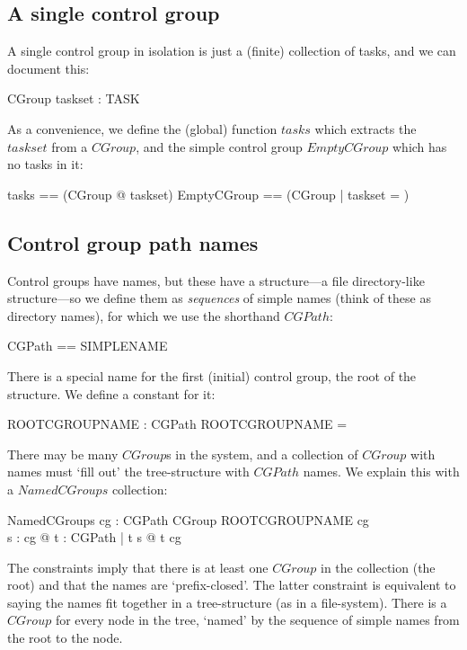 \documentclass[a4paper,twoside,12pt]{article}
\begin{document}
\subsection{A single control group}

A single control group in isolation is just a (finite) collection of tasks, and we can document this:

\begin{schema}{CGroup}
taskset : \finset TASK
\end{schema}

As a convenience, we define the (global) function $tasks$ which extracts the $taskset$ from a $CGroup$, and the
simple control group $EmptyCGroup$ which has no tasks in it:
\begin{zed}
tasks == (\lambda CGroup @ taskset)
\also
EmptyCGroup == (\mu CGroup | taskset = \emptyset )
\end{zed}

\subsection{Control group path names}

Control groups have names, but these have a structure---a file directory-like structure---so we define them as \emph{sequences} of simple names (think of these as directory names), for which we use the shorthand $CGPath$:

\begin{zed}
CGPath == \seq SIMPLENAME
\end{zed}

There is a special name for the first (initial) control group, the root of the structure. We define a constant for it:

\begin{axdef}{}
ROOTCGROUPNAME : CGPath
\where
ROOTCGROUPNAME = \langle \rangle
\end{axdef}

There may be many $CGroup$s in the system, and a collection of $CGroup$ with names must `fill out' the tree-structure with $CGPath$ names. We explain this with a $NamedCGroups$ collection:

\begin{schema}{NamedCGroups}
cg : CGPath \ffun CGroup
\where
ROOTCGROUPNAME \in \dom cg \\
\forall s : \dom cg @ \forall t : CGPath | t \subset s @ t \in \dom cg
\end{schema}
The constraints imply that there is  at least one $CGroup$ in the collection (the root) and that the names are `prefix-closed'. The latter constraint is equivalent to saying the names fit together in a tree-structure (as in a file-system).
There is a $CGroup$ for every node in the tree, `named' by the sequence of simple names from the root to the node.
\end{document}
